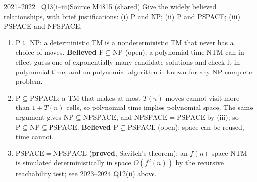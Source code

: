 \documentclass[11pt,a4paper]{article}
\begin{document}
\begin{question}{2021--2022 \textbullet\ Q13(i--iii)}{Source M48}{15 (shared)}
Give the widely believed relationships, with brief justifications: (i) P and NP; (ii) P and PSPACE; (iii) PSPACE and NPSPACE.
\end{question}
\begin{solution}
\begin{enumerate}[label=\textbf{(\roman*)}]
\item $\mathrm P\subseteq\mathrm{NP}$: a deterministic TM is a nondeterministic TM that never has a choice of moves. \textbf{Believed $\mathrm P\subsetneq\mathrm{NP}$} (open): a polynomial-time NTM can in effect guess one of exponentially many candidate solutions and check it in polynomial time, and no polynomial algorithm is known for any NP-complete problem.
\item $\mathrm P\subseteq\mathrm{PSPACE}$: a TM that makes at most $T(n)$ moves cannot visit more than $1+T(n)$ cells, so polynomial time implies polynomial space. The same argument gives $\mathrm{NP}\subseteq\mathrm{NPSPACE}$, and $\mathrm{NPSPACE}=\mathrm{PSPACE}$ by (iii); so $\mathrm P\subseteq\mathrm{NP}\subseteq\mathrm{PSPACE}$. \textbf{Believed $\mathrm P\subsetneq\mathrm{PSPACE}$} (open): space can be reused, time cannot.
\item $\mathrm{PSPACE}=\mathrm{NPSPACE}$ (\textbf{proved}, Savitch's theorem): an $f(n)$-space NTM is simulated deterministically in space $O(f^2(n))$ by the recursive reachability test; see 2023--2024 Q12(ii) above.
\end{enumerate}
\end{solution}
\end{document}
